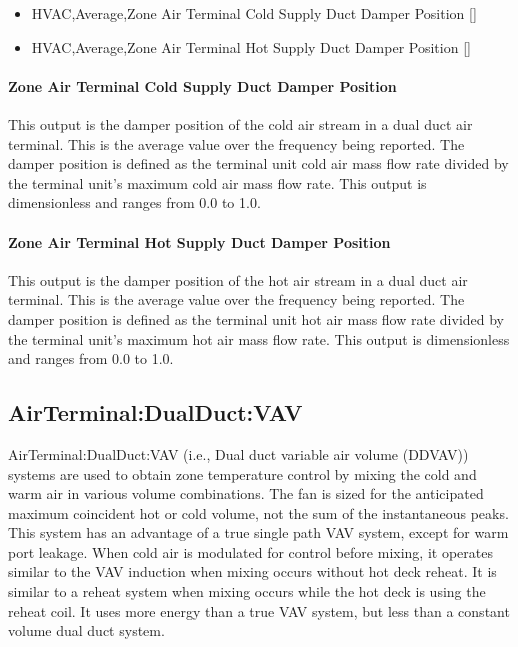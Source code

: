 \begin{itemize}
\item
  HVAC,Average,Zone Air Terminal Cold Supply Duct Damper Position {[]}
\item
  HVAC,Average,Zone Air Terminal Hot Supply Duct Damper Position {[]}
\end{itemize}

\paragraph{Zone Air Terminal Cold Supply Duct Damper Position}\label{zone-air-terminal-cold-supply-duct-damper-position}

This output is the damper position of the cold air stream in a dual duct air terminal. This is the average value over the frequency being reported. The damper position is defined as the terminal unit cold air mass flow rate divided by the terminal unit's maximum cold air mass flow rate. This output is dimensionless and ranges from 0.0 to 1.0.

\paragraph{Zone Air Terminal Hot Supply Duct Damper Position}\label{zone-air-terminal-hot-supply-duct-damper-position}

This output is the damper position of the hot air stream in a dual duct air terminal. This is the average value over the frequency being reported. The damper position is defined as the terminal unit hot air mass flow rate divided by the terminal unit's maximum hot air mass flow rate. This output is dimensionless and ranges from 0.0 to 1.0.

\subsection{AirTerminal:DualDuct:VAV}\label{airterminaldualductvav}

AirTerminal:DualDuct:VAV (i.e., Dual duct variable air volume (DDVAV)) systems are used to obtain zone temperature control by mixing the cold and warm air in various volume combinations. The fan is sized for the anticipated maximum coincident hot or cold volume, not the sum of the instantaneous peaks. This system has an advantage of a true single path VAV system, except for warm port leakage. When cold air is modulated for control before mixing, it operates similar to the VAV induction when mixing occurs without hot deck reheat. It is similar to a reheat system when mixing occurs while the hot deck is using the reheat coil. It uses more energy than a true VAV system, but less than a constant volume dual duct system.


